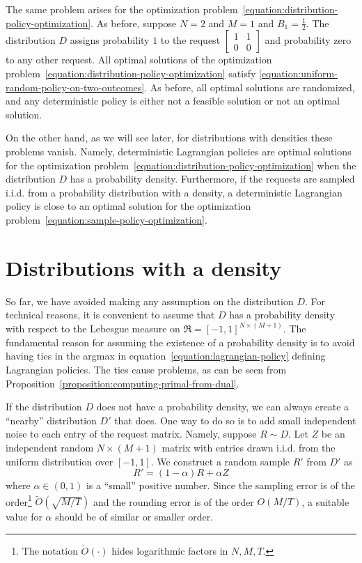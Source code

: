 \documentclass[12pt]{article}
\newcommand{\Requests}{\mathfrak{R}}
\theoremstyle{definition}
\begin{document}
The same problem arises for the optimization
problem~\eqref{equation:distribution-policy-optimization}. As before,
suppose $N=2$ and $M=1$ and $B_1=\frac{1}{2}$. The distribution $D$ assigns
probability $1$ to the request $\left[\begin{smallmatrix} 1 & 1 \\ 0 & 0
\end{smallmatrix}\right]$ and probability zero to any other request. All optimal
solutions of the optimization
problem~\eqref{equation:distribution-policy-optimization} satisfy
\eqref{equation:uniform-random-policy-on-two-outcomes}. As before, all
optimal solutions are randomized, and any deterministic policy is either not a
feasible solution or not an optimal solution.

On the other hand, as we will see later, for distributions with densities these
problems vanish. Namely, deterministic Lagrangian policies are optimal solutions
for the optimization problem~\eqref{equation:distribution-policy-optimization}
when the distribution $D$ has a probability density. Furthermore, if the
requests are sampled i.i.d. from a probability distribution with a density, a
deterministic Lagrangian policy is close to an optimal solution for the
optimization problem~\eqref{equation:sample-policy-optimization}.


\section{Distributions with a density}

So far, we have avoided making any assumption on the distribution $D$. For
technical reasons, it is convenient to assume that $D$ has a probability density
with respect to the Lebesgue measure on $\Requests = [-1,1]^{N \times (M+1)}$.
The fundamental reason for assuming the existence of a probability density is to
avoid having ties in the argmax in equation~\eqref{equation:lagrangian-policy}
defining Lagrangian policies. The ties cause problems, as can be seen from
Proposition~\ref{proposition:computing-primal-from-dual}.

If the distribution $D$ does not have a probability density, we can always
create a ``nearby'' distribution $D'$ that does. One way to do so is to add
small independent noise to each entry of the request matrix. Namely, suppose $R
\sim D$. Let $Z$ be an independent random $N \times (M+1)$ matrix with entries
drawn i.i.d. from the uniform distribution over $[-1,1]$. We construct a random
sample $R'$ from $D'$ as
\begin{equation}
\label{equation:modified-sample}
R' = (1-\alpha)R + \alpha Z
\end{equation}
where $\alpha \in (0,1)$ is a ``small'' positive number. Since the sampling
error is of the order\footnote{The notation $\widetilde{O}(\cdot)$ hides
logarithmic factors in $N,M,T$.} $\widetilde{O}(\sqrt{M/T})$ and the rounding
error is of the order $O(M/T)$, a suitable value for $\alpha$ should be of
similar or smaller order.
\end{document}
